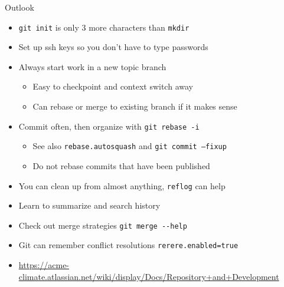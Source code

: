 \documentclass{beamer}
\begin{document}
\begin{frame}{Outlook}
  \begin{itemize}
  \item \texttt{git init} is only 3 more characters than \texttt{mkdir}
  \item Set up ssh keys so you don't have to type passwords
  \item Always start work in a new topic branch
    \begin{itemize}
    \item Easy to checkpoint and context switch away
    \item Can rebase or merge to existing branch if it makes sense
    \end{itemize}
  \item Commit often, then organize with \texttt{git rebase -i}
    \begin{itemize}
    \item See also \texttt{rebase.autosquash} and \texttt{git commit --fixup}
    \item Do not rebase commits that have been published
    \end{itemize}
  \item You can clean up from almost anything, \texttt{reflog} can help
  \item Learn to summarize and search history
  \item Check out merge strategies \texttt{git merge -{}-help}
  \item Git can remember conflict resolutions \texttt{rerere.enabled=true}
  \item \url{https://acme-climate.atlassian.net/wiki/display/Docs/Repository+and+Development}
  \end{itemize}
\end{frame}
\end{document}
